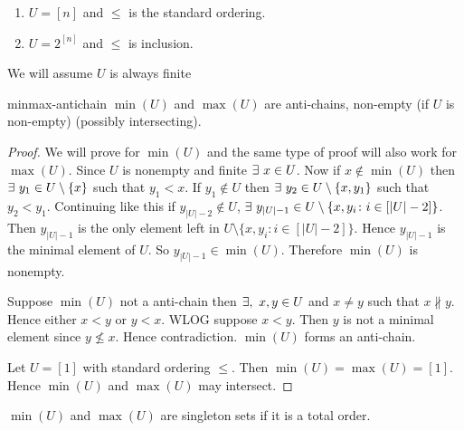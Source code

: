 \begin{Example}{}{}
	\begin{enumerate}[label=(\alph*)]
		\item $U=[n]$ and $\leq $ is the standard ordering.
		\item $U=2^{[n]}$ and $\leq $ is inclusion. 
	\end{enumerate}
\end{Example}


\begin{assumption*}
	We will assume $U$ is always finite
\end{assumption*}
\begin{lemma}{}{minmax-antichain}
	$\min (U)$ and $\max{(U)}$ are anti-chains, non-empty (if $U$ is non-empty) (possibly intersecting).
\end{lemma}
\begin{proof}
	We will prove for $\min(U)$ and the same type of proof will also work for $\max(U)$. Since $U$ is nonempty and finite $\exists \ x\in U$. Now if $x\notin \min(U)$ then $\exists\ y_1\in U\setminus\{x\}$ such that $y_1<x$. If $y_1\notin U$ then $\exists\ y_2\in U\setminus\{x,y_1\}$ such that $y_2<y_1$. Continuing like this if $y_{|U|-2}\notin U$, $\exists\ y_{|U|-1}\in U\setminus\{x,y_i\colon i\in[|U|-2]\}$. Then $y_{|U|-1}$ is the only element left in $U\setminus\{x,y_i\colon i\in[|U|-2]\}$. Hence $y_{|U|-1}$ is the minimal element of $U$. So $y_{|U|-1}\in \min(U)$. Therefore $\min(U)$ is nonempty.
	
	 Suppose $\min(U)$  not a anti-chain then $\exists,\ x,y\in U$ and $x\neq y$ such that $x\nparallel
	  y$. Hence either $x<y$ or $y<x$. WLOG suppose $x<y$. Then $y$ is not a minimal element since $y\not\leq x$. Hence contradiction. $\min(U)$ forms an anti-chain.
	 
	 Let $U=[1]$ with standard ordering $\leq$. Then $\min(U)=\max(U)=[1]$. Hence $\min(U)$ and $\max(U)$ may intersect. 
\end{proof}
\begin{observation*}
	$\min(U)$ and $\max(U)$ are singleton sets  if it is a total order. 
\end{observation*}

